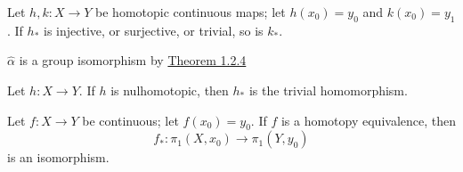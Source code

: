 \documentclass[12pt,a4paper]{article}
\begin{document}
    \begin{cor}
        Let $h,k:X\to Y$ be homotopic continuous maps; let $h(x_0)=y_0$ and $k(x_0)=y_1$. If $h_*$ is injective, or surjective, or trivial, so is $k_*$.
    \end{cor}
    \begin{remark}
        $\hat{\alpha}$ is a group isomorphism by \hyperref[1.2.4]{Theorem 1.2.4}
    \end{remark}
    \begin{cor}
        Let $h:X\to Y$. If $h$ is nulhomotopic, then $h_*$ is the trivial homomorphism.
    \end{cor}
    \bigskip

    \begin{thm}\label{1.5.10}
        Let $f:X\to Y$ be continuous; let $f(x_0)=y_0$. If $f$ is a homotopy equivalence, then
        \[
            f_*:\pi_1(X,x_0)\to \pi_1(Y,y_0)
        \]
        is an isomorphism.
    \end{thm}
    \bigskip
\end{document}
